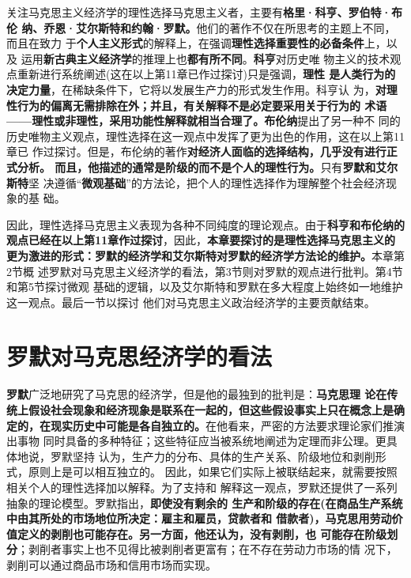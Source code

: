 关注马克思主义经济学的理性选择马克思主义者，主要有\textbf{格里·科亨、罗伯特·布伦
  纳、乔恩·艾尔斯特和约翰·罗默。}他们的著作不仅在所思考的主题上不同，而且在致力
于\textbf{个人主义形式}的解释上，在强调\textbf{理性选择重要性的必备条件}上，以及
运用\textbf{新古典主义经济学}的推理上也\textbf{都有所不同}。\textbf{科亨}对历史唯
物主义的技术观点重新进行系统阐述(这在以上第11章已作过探讨)只是强调，\textbf{理性
  是人类行为的决定力量}，在稀缺条件下，它将以发展生产力的形式发生作用。科亨认
为，\textbf{对理性行为的偏离无需排除在外；并且，有关解释不是必定要采用关于行为的
  术语——理性或非理性，采用功能性解释就相当合理了。}\textbf{布伦纳}提出了另一种不
同的历史唯物主义观点，理性选择在这一观点中发挥了更为出色的作用，这在以上第11章已
作过探讨。但是，布伦纳的著作\textbf{对经济人面临的选择结构，几乎没有进行正式分析。
  而且，他描述的通常是阶级的而不是个人的理性行为。}只有\textbf{罗默和艾尔斯特}坚
决遵循“\textbf{微观基础}”的方法论，把个人的理性选择作为理解整个社会经济现象的基
础。

因此，理性选择马克思主义表现为各种不同纯度的理论观点。由于\textbf{科亨和布伦纳的
  观点已经在以上第11章作过探讨}，因此，\textbf{本章要探讨的是理性选择马克思主义的
  更为激进的形式：罗默的经济学和艾尔斯特对罗默的经济学方法论的维护。}本章第2节概
述罗默对马克思主义经济学的看法，第3节则对罗默的观点进行批判。第4节和第5节探讨微观
基础的逻辑，以及艾尔斯特和罗默在多大程度上始终如一地维护这一观点。最后一节以探讨
他们对马克思主义政治经济学的主要贡献结束。

\section{罗默对马克思经济学的看法}

\textbf{罗默}广泛地研究了马克思的经济学，但是他的最独到的批判是：\textbf{马克思理
  论在传统上假设社会现象和经济现象是联系在一起的，但这些假设事实上只在概念上是确
  定的，在现实历史中可能是各自独立的。}在他看来，严密的方法要求理论家们推演出事物
同时具备的多种特征；这些特征应当被系统地阐述为定理而非公理。更具体地说，罗默坚持
认为，生产力的分布、具体的生产关系、阶级地位和剥削形式，原则上是可以相互独立的。
因此，如果它们实际上被联结起来，就需要按照相关个人的理性选择加以解释。为了支持和
解释这一观点，罗默还提供了一系列抽象的理论模型。罗默指出，\textbf{即使没有剩余的
  生产和阶级的存在(在商品生产系统中由其所处的市场地位所决定：雇主和雇员，贷款者和
  借款者)，马克思用劳动价值定义的剥削也可能存在。另一方面，他还认为，没有剥削，也
  可能存在阶级划分}；剥削者事实上也不见得比被剥削者更富有；在不存在劳动力市场的情
况下，剥削可以通过商品市场和信用市场而实现。

